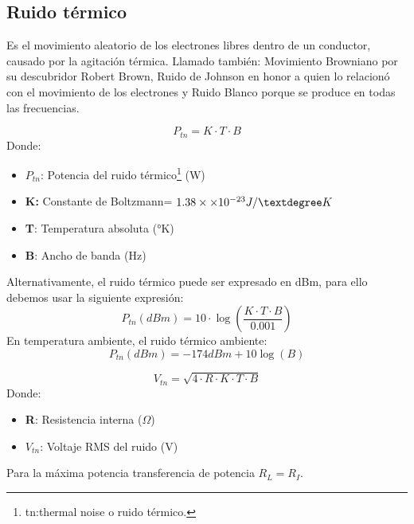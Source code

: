 \documentclass[12pt,fleqn,a4paper,oneside]{LegrandOrangeBook}
\begin{document}
\subsection*{Ruido térmico}
Es el movimiento aleatorio de los electrones libres dentro de un conductor, causado por la agitación térmica.
Llamado también: Movimiento Browniano por su descubridor Robert Brown, Ruido de Johnson en honor a quien lo relacionó con el movimiento de los electrones y Ruido Blanco porque se produce en todas las frecuencias.
\begin{definition}
\begin{equation}
P_{tn}=K\cdot T\cdot B
\label{eq:ruido termico}
\end{equation}
Donde:
\begin{itemize}
\item $P_{tn}$: Potencia del ruido térmico\footnote{tn:thermal noise o ruido térmico.} (W)
\item \textbf{K:} Constante de Boltzmann= $1.38\times\basedec{-23} J/°K$
\item \textbf{T}: Temperatura absoluta (°K)
\item \textbf{B}: Ancho de banda (Hz)
\end{itemize}
Alternativamente, el ruido térmico puede ser expresado en dBm, para ello debemos usar la siguiente expresión:
\begin{equation}
P_{tn}(dBm)=10\cdot\log\left(\frac{K\cdot T\cdot B}{0.001}\right)
\label{eq:ruido termico log}
\end{equation}
En temperatura ambiente, el ruido térmico ambiente:
\begin{equation}
P_{tn}(dBm)=-174 dBm+10\log(B)
\label{eq:ruido termico ambiente}
\end{equation}
\end{definition}
\begin{definition}
\begin{equation}
V_{tn}=\sqrt{4\cdot R\cdot K\cdot T\cdot B}
\label{eq:voltaje ruido termico}
\end{equation}
Donde:
\begin{itemize}
\item \textbf{R}: Resistencia interna ($\Omega$)
\item \textbf{$V_{tn}$}: Voltaje RMS del ruido (V)
\end{itemize}
\end{definition}
\begin{notation}
Para la máxima potencia transferencia de potencia $R_L=R_I$.
\end{notation}
\end{document}
